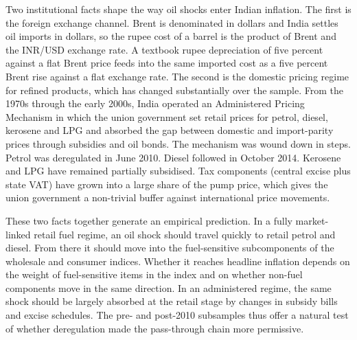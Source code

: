 \documentclass[11pt,a4paper]{article}
\begin{document}
Two institutional facts shape the way oil shocks enter Indian inflation. The first is the foreign exchange channel. Brent is denominated in dollars and India settles oil imports in dollars, so the rupee cost of a barrel is the product of Brent and the INR/USD exchange rate. A textbook rupee depreciation of five percent against a flat Brent price feeds into the same imported cost as a five percent Brent rise against a flat exchange rate. The second is the domestic pricing regime for refined products, which has changed substantially over the sample. From the 1970s through the early 2000s, India operated an Administered Pricing Mechanism in which the union government set retail prices for petrol, diesel, kerosene and LPG and absorbed the gap between domestic and import-parity prices through subsidies and oil bonds. The mechanism was wound down in steps. Petrol was deregulated in June 2010. Diesel followed in October 2014. Kerosene and LPG have remained partially subsidised. Tax components (central excise plus state VAT) have grown into a large share of the pump price, which gives the union government a non-trivial buffer against international price movements.

These two facts together generate an empirical prediction. In a fully market-linked retail fuel regime, an oil shock should travel quickly to retail petrol and diesel. From there it should move into the fuel-sensitive subcomponents of the wholesale and consumer indices. Whether it reaches headline inflation depends on the weight of fuel-sensitive items in the index and on whether non-fuel components move in the same direction. In an administered regime, the same shock should be largely absorbed at the retail stage by changes in subsidy bills and excise schedules. The pre- and post-2010 subsamples thus offer a natural test of whether deregulation made the pass-through chain more permissive.
\end{document}
